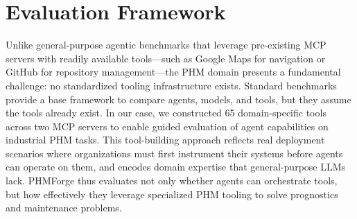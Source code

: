 \documentclass[sigconf]{acmart}
\begin{document}

                                                             
\section{Evaluation Framework}                                                           
                                                                                           
  Unlike general-purpose agentic benchmarks that leverage pre-existing MCP servers with    
  readily                                                                                  
  available tools---such as Google Maps for navigation or GitHub for repository            
  management---the                                                                         
  PHM domain presents a fundamental challenge: no standardized tooling infrastructure      
  exists.                                                                                  
  Standard benchmarks provide a base framework to compare agents, models, and tools, but   
  they                                                                                     
  assume the tools already exist. In our case, we constructed 65 domain-specific tools     
  across                                                                                   
  two MCP servers to enable guided evaluation of agent capabilities on industrial PHM      
  tasks.                                                                                   
  This tool-building approach reflects real deployment scenarios where organizations must  
  first                                                                                    
  instrument their systems before agents can operate on them, and encodes domain expertise 
  that general-purpose LLMs lack. PHMForge thus evaluates not only whether agents can      
  orchestrate tools, but how effectively they leverage specialized PHM tooling to solve    
  prognostics and maintenance problems.                                                    
                                                                                           
\end{document}
